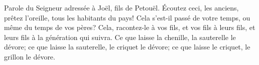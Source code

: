 Parole du Seigneur adressée à Joël, fils de Petouël.
Écoutez ceci, les anciens, prêtez l’oreille, tous les habitants du pays!
	Cela s’est-il passé de votre temps, ou même du temps de vos pères?
Cela, racontez-le à vos fils, et vos fils à leurs fils,
	et leurs fils à la génération qui suivra.
Ce que laisse la chenille, la sauterelle le dévore;
	ce que laisse la sauterelle, le criquet le dévore;
	ce que laisse le criquet, le grillon le dévore.
